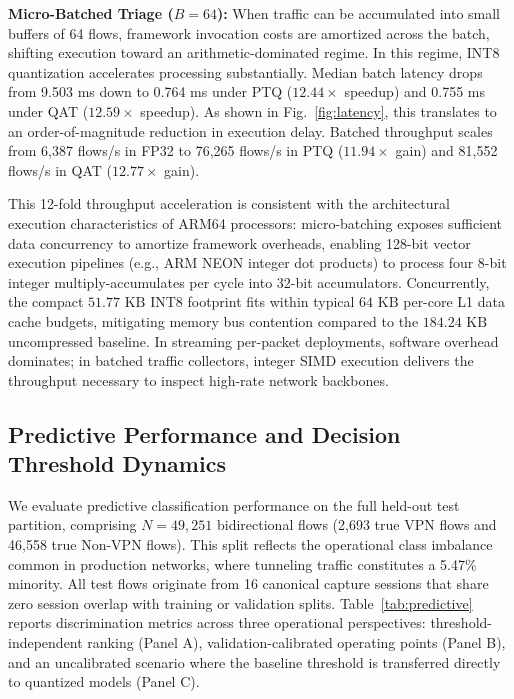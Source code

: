 \documentclass[conference]{IEEEtran}
\begin{document}
\textbf{Micro-Batched Triage ($B = 64$):} When traffic can be accumulated into small buffers of 64 flows, framework invocation costs are amortized across the batch, shifting execution toward an arithmetic-dominated regime. In this regime, INT8 quantization accelerates processing substantially. Median batch latency drops from 9.503 ms down to 0.764 ms under PTQ ($12.44\times$ speedup) and 0.755 ms under QAT ($12.59\times$ speedup). As shown in Fig.~\ref{fig:latency}, this translates to an order-of-magnitude reduction in execution delay. Batched throughput scales from 6,387 flows/s in FP32 to 76,265 flows/s in PTQ ($11.94\times$ gain) and 81,552 flows/s in QAT ($12.77\times$ gain).

This 12-fold throughput acceleration is consistent with the architectural execution characteristics of ARM64 processors: micro-batching exposes sufficient data concurrency to amortize framework overheads, enabling 128-bit vector execution pipelines (e.g., ARM NEON integer dot products) to process four 8-bit integer multiply-accumulates per cycle into 32-bit accumulators. Concurrently, the compact $51.77\text{ KB}$ INT8 footprint fits within typical $64\text{ KB}$ per-core L1 data cache budgets, mitigating memory bus contention compared to the $184.24\text{ KB}$ uncompressed baseline. In streaming per-packet deployments, software overhead dominates; in batched traffic collectors, integer SIMD execution delivers the throughput necessary to inspect high-rate network backbones.

\subsection{Predictive Performance and Decision Threshold Dynamics}

We evaluate predictive classification performance on the full held-out test partition, comprising $N = 49,251$ bidirectional flows (2,693 true VPN flows and 46,558 true Non-VPN flows). This split reflects the operational class imbalance common in production networks, where tunneling traffic constitutes a 5.47\% minority. All test flows originate from 16 canonical capture sessions that share zero session overlap with training or validation splits. Table~\ref{tab:predictive} reports discrimination metrics across three operational perspectives: threshold-independent ranking (Panel A), validation-calibrated operating points (Panel B), and an uncalibrated scenario where the baseline threshold is transferred directly to quantized models (Panel C).
\end{document}
